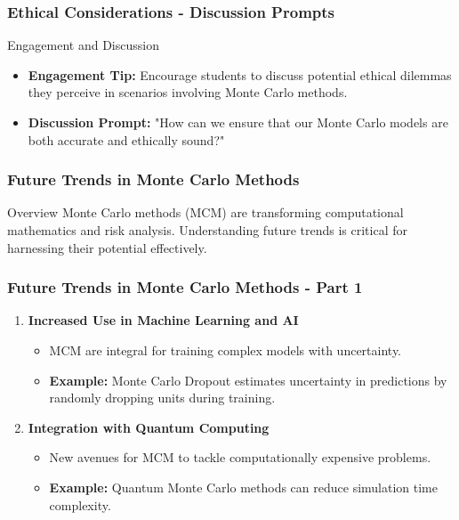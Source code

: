 \documentclass[aspectratio=169]{beamer}
\begin{document}
\begin{frame}[fragile]
    \frametitle{Ethical Considerations - Discussion Prompts}
    \begin{block}{Engagement and Discussion}
        \begin{itemize}
            \item \textbf{Engagement Tip:} Encourage students to discuss potential ethical dilemmas they perceive in scenarios involving Monte Carlo methods.
            \item \textbf{Discussion Prompt:} "How can we ensure that our Monte Carlo models are both accurate and ethically sound?"
        \end{itemize}
    \end{block}
\end{frame}

\begin{frame}[fragile]
    \frametitle{Future Trends in Monte Carlo Methods}
    \begin{block}{Overview}
        Monte Carlo methods (MCM) are transforming computational mathematics and risk analysis. Understanding future trends is critical for harnessing their potential effectively.
    \end{block}
\end{frame}

\begin{frame}[fragile]
    \frametitle{Future Trends in Monte Carlo Methods - Part 1}
    \begin{enumerate}
        \item \textbf{Increased Use in Machine Learning and AI}
            \begin{itemize}
                \item MCM are integral for training complex models with uncertainty.
                \item \textbf{Example:} Monte Carlo Dropout estimates uncertainty in predictions by randomly dropping units during training.
            \end{itemize}

        \item \textbf{Integration with Quantum Computing}
            \begin{itemize}
                \item New avenues for MCM to tackle computationally expensive problems.
                \item \textbf{Example:} Quantum Monte Carlo methods can reduce simulation time complexity.
            \end{itemize}
    \end{enumerate}
\end{frame}
\end{document}
